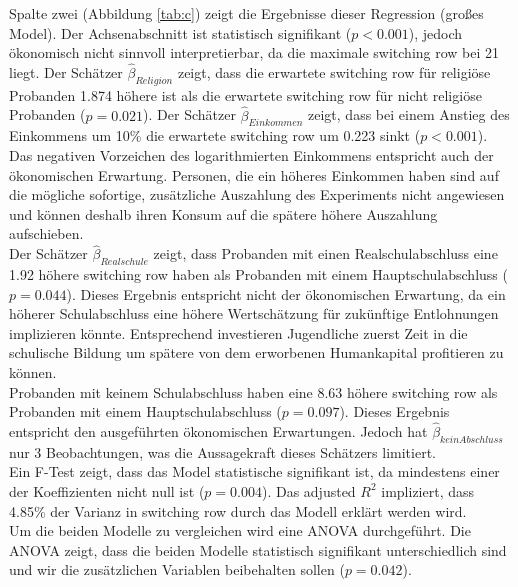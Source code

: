 \documentclass[11pt,a4paper]{article}
\begin{document}
Spalte zwei (Abbildung \ref{tab:c}) zeigt die Ergebnisse dieser Regression (großes Model). Der Achsenabschnitt ist statistisch signifikant ($p < 0.001$), jedoch ökonomisch nicht sinnvoll interpretierbar, da die maximale switching row bei 21 liegt. Der Schätzer $\hat{\beta}_{Religion}$ zeigt, dass die erwartete switching row für religiöse Probanden 1.874 höhere ist als die erwartete switching row für nicht religiöse Probanden ($p = 0.021$). Der Schätzer $\hat{\beta}_{Einkommen}$ zeigt, dass bei einem Anstieg des Einkommens um 10\% die erwartete switching row um 0.223 sinkt ($p < 0.001$). Das negativen Vorzeichen des logarithmierten Einkommens entspricht auch der ökonomischen Erwartung. Personen, die ein höheres Einkommen haben sind auf die mögliche sofortige, zusätzliche Auszahlung des Experiments nicht angewiesen und können deshalb ihren Konsum auf die spätere höhere Auszahlung aufschieben.\\
Der Schätzer $\hat{\beta}_{Realschule}$ zeigt, dass Probanden mit einen Realschulabschluss eine 1.92 höhere switching row haben als Probanden mit einem Hauptschulabschluss  ($p = 0.044$). Dieses Ergebnis entspricht nicht der ökonomischen Erwartung, da ein höherer Schulabschluss eine höhere Wertschätzung für zukünftige Entlohnungen implizieren könnte. Entsprechend investieren Jugendliche zuerst Zeit in die schulische Bildung um spätere von dem erworbenen Humankapital profitieren zu können.\\
Probanden mit keinem Schulabschluss haben eine 8.63 höhere switching row als Probanden mit einem Hauptschulabschluss ($p = 0.097$). Dieses Ergebnis entspricht den ausgeführten ökonomischen Erwartungen. Jedoch hat $\hat{\beta}_{kein Abschluss}$ nur 3 Beobachtungen, was die Aussagekraft dieses Schätzers limitiert.\\ 


Ein F-Test zeigt, dass das Model statistische signifikant ist, da mindestens einer der Koeffizienten nicht null ist ($p = 0.004$). Das adjusted $R^2$ impliziert, dass 4.85\% der Varianz in switching row durch das Modell erklärt werden wird.\\ 

Um die beiden Modelle zu vergleichen wird eine ANOVA durchgeführt. Die ANOVA zeigt, dass die beiden Modelle statistisch signifikant unterschiedlich sind und wir die zusätzlichen Variablen beibehalten sollen ($p = 0.042$).\\ 



\end{document}

